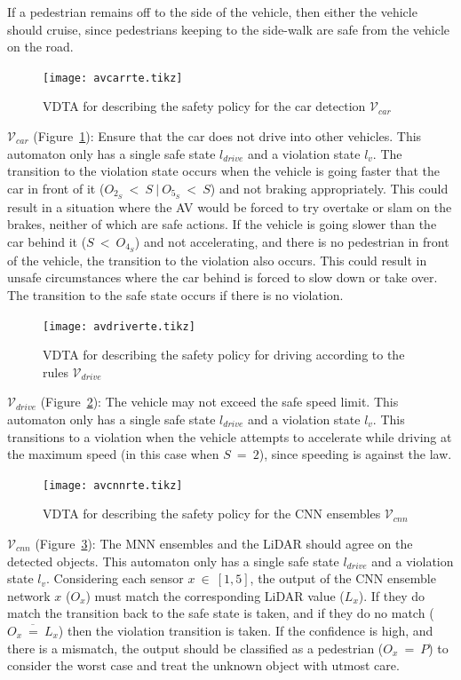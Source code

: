 If a pedestrian remains off to the side of the vehicle, then either the vehicle should cruise, since pedestrians keeping to the side-walk are safe from the vehicle on the road.

\begin{figure}[h]
	\centering
	\texttt{[image: avcarrte.tikz]}
	\caption{\ac{VDTA} for describing the safety policy for the car detection $\mathcal{V}_{car}$\label{fig:avcarrte}}
\end{figure}

$\mathcal{V}_{car}$ (Figure~\ref{fig:avcarrte}): Ensure that the car does not drive into other vehicles. 
This automaton only has a single safe state $l_{drive}$ and a violation state $l_v$.
The transition to the violation state occurs when the vehicle is going faster that the car in front of it ($O_{2_S}~<~S~|~O_{5_S}~<~S$) and not braking appropriately.
This could result in a situation where the \ac{AV} would be forced to try overtake or slam on the brakes, neither of which are safe actions.
If the vehicle is going slower than the car behind it ($S~<~O_{4_S}$) and not accelerating, and there is no pedestrian in front of the vehicle, the transition to the violation also occurs.
This could result in unsafe circumstances where the car behind is forced to slow down or take over.
The transition to the safe state occurs if there is no violation.

\begin{figure}[h]
	\centering
	\texttt{[image: avdriverte.tikz]}
	\caption{\ac{VDTA} for describing the safety policy for driving according to the rules $\mathcal{V}_{drive}$\label{fig:avdriverte}}
\end{figure}

$\mathcal{V}_{drive}$ (Figure~\ref{fig:avdriverte}): The vehicle may not exceed the safe speed limit. 
This automaton only has a single safe state $l_{drive}$ and a violation state $l_v$.
This transitions to a violation when the vehicle attempts to accelerate while driving at the maximum speed (in this case when $S~=~2$), since speeding is against the law.

\begin{figure}[h]
	\centering
	\texttt{[image: avcnnrte.tikz]}
	\caption{\ac{VDTA} for describing the safety policy for the \ac{CNN} ensembles $\mathcal{V}_{cnn}$\label{fig:avcnnrte}}
\end{figure}

$\mathcal{V}_{cnn}$ (Figure~\ref{fig:avcnnrte}): The \ac{MNN} ensembles and the \ac{LiDAR} should agree on the detected objects.
This automaton only has a single safe state $l_{drive}$ and a violation state $l_v$.
Considering each sensor $x~\in~[1,5]$, the output of the \ac{CNN} ensemble network $x$ ($O_x$) must match the corresponding \ac{LiDAR} value ($L_x$).
If they do match the transition back to the safe state is taken, and if they do no match ($\overline{O_x~=~L_x}$) then the violation transition is taken.
If the confidence is high, and there is a mismatch, the output should be classified as a pedestrian ($O_x~=~P$) to consider the worst case and treat the unknown object with utmost care.

